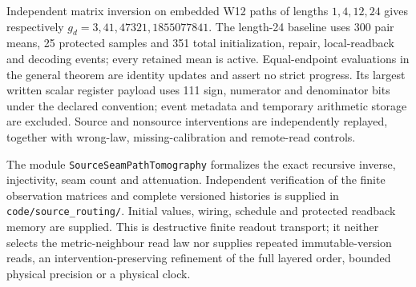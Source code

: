 Independent matrix inversion on embedded W12 paths of lengths $1,4,12,24$
gives respectively $g_d=3,41,47321,1855077841$.
The length-24 baseline uses 300 pair means, 25 protected samples and 351
total initialization, repair, local-readback and decoding events; every
retained mean is active. Equal-endpoint evaluations in the general theorem
are identity updates and assert no strict progress. Its
largest written scalar register payload uses 111 sign, numerator and
denominator bits under the declared convention; event metadata and temporary
arithmetic storage are excluded. Source and nonsource
interventions are independently replayed, together with wrong-law,
missing-calibration and remote-read controls.

The module \texttt{SourceSeamPathTomography} formalizes the exact recursive
inverse, injectivity, seam count and attenuation. Independent verification of
the finite observation matrices and complete versioned histories is supplied
in \texttt{code/source\_routing/}. Initial values, wiring, schedule and protected
readback memory are supplied. This is destructive finite readout transport;
it neither selects the metric-neighbour read law nor supplies repeated
immutable-version reads, an intervention-preserving refinement of the full
layered order, bounded physical precision or a physical clock.
